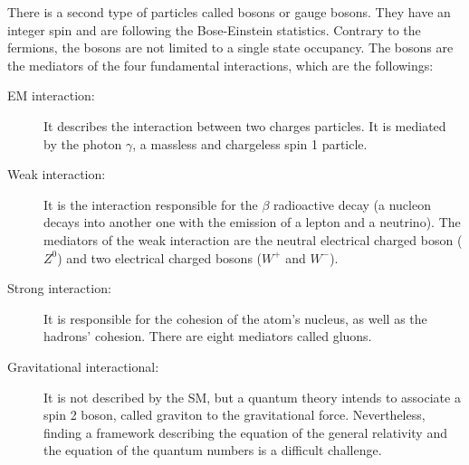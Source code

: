     There is a second type of particles called bosons or gauge bosons.
    They have an integer spin and are following the Bose-Einstein statistics.
    Contrary to the fermions, the bosons are not limited to a single state occupancy.
    The bosons are the mediators of the four fundamental interactions, which are the followings:
    
    \begin{description}
      \item[\gls{EM} interaction:] It describes the interaction between two charges particles. 
      It is mediated by the photon $\gamma$, a massless and chargeless spin 1 particle.

      \item[Weak interaction:] It is the interaction responsible for the $\beta$ radioactive decay (a nucleon decays into another one with the emission of a lepton and a neutrino).
       The mediators of the weak interaction are the neutral electrical charged boson ($Z^0$) and two electrical charged bosons ($W^+$ and $W^-$).

      \item[Strong interaction:] It is responsible for the cohesion of the atom's nucleus, as well as the hadrons' cohesion.
      There are eight mediators called gluons.

      \item[Gravitational interactional:] It is not described by the \gls{SM}, but a quantum theory intends to associate a spin 2 boson, called graviton to the gravitational force.
      Nevertheless, finding a framework describing the equation of the general relativity and the equation of the quantum numbers is a difficult challenge.
    \end{description}


